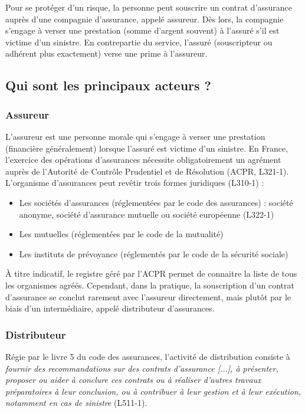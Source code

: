 \documentclass{article}
\begin{document}
Pour se protéger d'un risque, la personne peut souscrire un contrat d'assurance auprès d'une compagnie d'assurance, appelé assureur. Dès lors, la compagnie s'engage à verser une prestation (somme d'argent souvent) à l'assuré s'il est victime d'un sinistre. En contrepartie du service, l'assuré (souscripteur ou adhérent plus exactement) verse une prime à l'assureur.

\subsection{Qui sont les principaux acteurs ?}
\subsubsection{Assureur}
L'assureur est une personne morale qui s'engage à verser une prestation (financière généralement) lorsque l'assuré est victime d'un sinistre. En France, l'exercice des opérations d'assurances nécessite obligatoirement un agrément auprès de l'Autorité de Contrôle Prudentiel et de Résolution (ACPR, L321-1). L'organisme d'assurances peut revêtir trois formes juridiques (L310-1) :
\begin{itemize}
    \item Les sociétés d'assurances (réglementées par le code des assurances) :  société anonyme, société d'assurance mutuelle ou société européenne (L322-1)
    \item Les mutuelles (réglementées par le code de la mutualité)
    \item Les instituts de prévoyance (réglementés par le code de la sécurité sociale)
\end{itemize}

À titre indicatif, le registre géré par l'ACPR permet de connaitre la liste de tous les organismes agréés. Cependant, dans la pratique, la souscription d'un contrat d'assurance se conclut rarement avec l'assureur directement, mais plutôt par le biais d'un intermédiaire, appelé distributeur d'assurances.

\subsubsection{Distributeur}
Régie par le livre 5 du code des assurances, l'activité de distribution consiste à \textit{fournir des recommandations sur des contrats d'assurance [...], à présenter, proposer ou aider à conclure ces contrats ou à réaliser d'autres travaux préparatoires à leur conclusion, ou à contribuer à leur gestion et à leur exécution, notamment en cas de sinistre} (L511-1).
\end{document}
